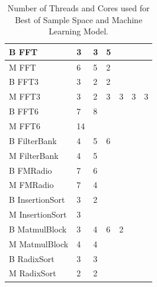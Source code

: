\begin{table}[t]
\begin{minipage}{0.5\textwidth}
\begin{tabular} { | l | l | l | l | l | l | l |}
	B FFT & 3 & 3 & 5 & \cellcolor[gray]{0.3}& \cellcolor[gray]{0.3}& \cellcolor[gray]{0.3} \\ \hline
    M FFT & 6& 5 & 2& \cellcolor[gray]{0.3}& \cellcolor[gray]{0.3}& \cellcolor[gray]{0.3}  \\ \hline\hline
    B FFT3 & 3 & 2 & 2& \cellcolor[gray]{0.3}& \cellcolor[gray]{0.3}& \cellcolor[gray]{0.3} \\ \hline 
    M FFT3 & 3 & 2 & 3 & 3& 3& 3 \\ \hline\hline
    B FFT6 & 7 & 8& \cellcolor[gray]{0.3}& \cellcolor[gray]{0.3}& \cellcolor[gray]{0.3}& \cellcolor[gray]{0.3}\\ \hline
    M FFT6& 14 & \cellcolor[gray]{0.3}& \cellcolor[gray]{0.3}& \cellcolor[gray]{0.3}& \cellcolor[gray]{0.3}& \cellcolor[gray]{0.3} \\ \hline\hline
    B FilterBank & 4 & 5 & 6& \cellcolor[gray]{0.3}& \cellcolor[gray]{0.3}& \cellcolor[gray]{0.3} \\ \hline
    M FilterBank & 4 & 5 & \cellcolor[gray]{0.3} & \cellcolor[gray]{0.3}& \cellcolor[gray]{0.3}& \cellcolor[gray]{0.3}\\ \hline\hline
    B FMRadio & 7 & 6 & \cellcolor[gray]{0.3}& \cellcolor[gray]{0.3}& \cellcolor[gray]{0.3}& \cellcolor[gray]{0.3}\\ \hline
    M FMRadio & 7 & 4 & \cellcolor[gray]{0.3} & \cellcolor[gray]{0.3}& \cellcolor[gray]{0.3}& \cellcolor[gray]{0.3} \\ \hline\hline
    B InsertionSort & 3 & 2& \cellcolor[gray]{0.3}& \cellcolor[gray]{0.3}& \cellcolor[gray]{0.3}& \cellcolor[gray]{0.3} \\ \hline
    M InsertionSort & 3 & \cellcolor[gray]{0.3}& \cellcolor[gray]{0.3}& \cellcolor[gray]{0.3}& \cellcolor[gray]{0.3}& \cellcolor[gray]{0.3}\\ \hline\hline
    B MatmulBlock & 3 & 4 & 6 & 2 & \cellcolor[gray]{0.3} & \cellcolor[gray]{0.3}\\ \hline
    M MatmulBlock & 4 & 4 & \cellcolor[gray]{0.3}& \cellcolor[gray]{0.3}& \cellcolor[gray]{0.3}& \cellcolor[gray]{0.3}\\ \hline\hline
    B RadixSort & 3 & 3& \cellcolor[gray]{0.3}& \cellcolor[gray]{0.3}& \cellcolor[gray]{0.3}& \cellcolor[gray]{0.3}\\ \hline
    M RadixSort & 2 & 2& \cellcolor[gray]{0.3}& \cellcolor[gray]{0.3}& \cellcolor[gray]{0.3}& \cellcolor[gray]{0.3}\\ \hline
    
 \end{tabular}
  \end{minipage}
  \caption{Number of Threads and Cores used for Best of Sample Space and Machine Learning Model.}\label{tab:summary}

\end{table}
\onecolumn
